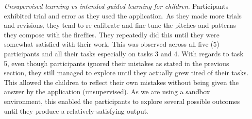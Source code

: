 \textit{Unsupervised learning vs intended guided learning for children}. Participants exhibited trial and error as they used the application. As they made more trials and revisions, they tend to re-calibrate and fine-tune the pitches and patterns they compose with the fireflies. They repeatedly did this until they were somewhat satisfied with their work. This was observed across all five (5) participants and all their tasks especially on tasks 3 and 4. With regards to task 5, even though participants ignored their mistakes as stated in the previous section, they still managed to explore until they actually grew tired of their tasks. This allowed the children to reflect their own mistakes without being given the answer by the application (unsupervised). As we are using a sandbox environment, this enabled the participants to explore several possible outcomes until they produce a relatively-satisfying output.